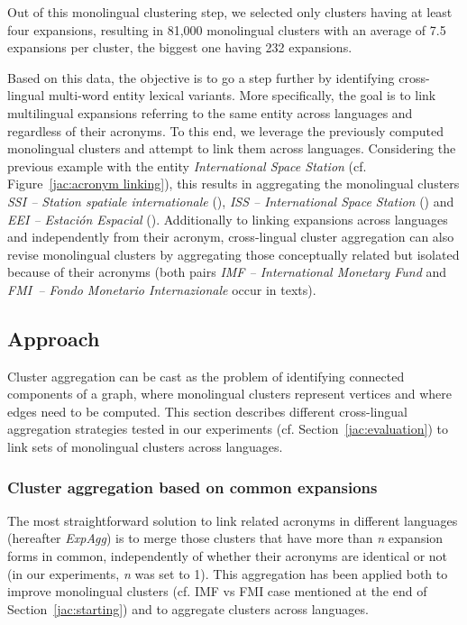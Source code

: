 \documentclass[output=paper]{langsci/langscibook}
\begin{document}
Out of this monolingual clustering step, we selected only clusters
having at least four expansions, resulting in 81,000 monolingual
clusters with an average of 7.5 expansions per cluster, the biggest
one having 232 expansions.

Based on this data, the objective is to go a step further by
identifying cross-lingual multi-word entity lexical variants. More
specifically, the goal is to link multilingual expansions referring to
the same entity across languages and regardless of their acronyms.  To
this end, we leverage the previously computed monolingual clusters and
attempt to link them across languages. Considering the previous
example with the entity \textit{International Space Station}
(cf. Figure~\ref{jac:acronym linking}), this results in aggregating the
monolingual clusters \textit{SSI -- Station spatiale internationale}
(), \textit{ISS -- International Space Station} () and
\textit{EEI -- Estaci\'{o}n Espacial} ().  Additionally to linking
expansions across languages and independently from their acronym,
cross-lingual cluster aggregation can also revise monolingual clusters
by aggregating those conceptually related but isolated because of
their acronyms (both pairs \textit{IMF -- International Monetary Fund}
and \textit{FMI~-- Fondo Monetario Internazionale} occur in 
texts).

\subsection{Approach}
\label{jac:approach}

Cluster aggregation can be cast as the problem of identifying
connected components of a graph, where monolingual clusters represent
vertices and where edges need to be computed.  This section describes
different cross-lingual aggregation strategies tested in our
experiments (cf. Section~\ref{jac:evaluation}) to link sets of monolingual
clusters across languages.

\subsubsection{Cluster aggregation based on common expansions}
\label{jac:aggregation clusters based on common expansions}

The most straightforward solution to link related acronyms in
different langua\-ges (hereafter \textit{ExpAgg}) is to merge those
clusters that have more than \textit{n} expansion forms in common,
independently of whether their acronyms are identical or not (in our
experiments, \textit{n} was set to 1). This aggregation has been
applied both to improve monolingual clusters (cf. IMF vs FMI case
mentioned at the end of Section~\ref{jac:starting}) and to aggregate
clusters across languages.
\end{document}
